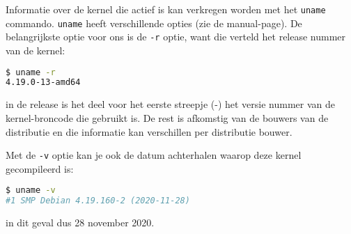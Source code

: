 Informatie over de kernel die actief is kan verkregen worden met het \texttt{uname} commando. \texttt{uname} heeft verschillende opties (zie de manual-page). De belangrijkste optie voor ons is de \texttt{-r} optie, want die verteld het release nummer van de kernel:
\begin{lstlisting}[language=bash]
$ uname -r
4.19.0-13-amd64
\end{lstlisting}
in de release is het deel voor het eerste streepje (-) het versie nummer van de kernel-broncode die gebruikt is. De rest is afkomstig van de bouwers van de distributie en die informatie kan verschillen per distributie bouwer.

Met de \texttt{-v} optie kan je ook de datum achterhalen waarop deze kernel gecompileerd is:
\begin{lstlisting}[language=bash]
$ uname -v
#1 SMP Debian 4.19.160-2 (2020-11-28)
\end{lstlisting}
in dit geval dus 28 november 2020.
